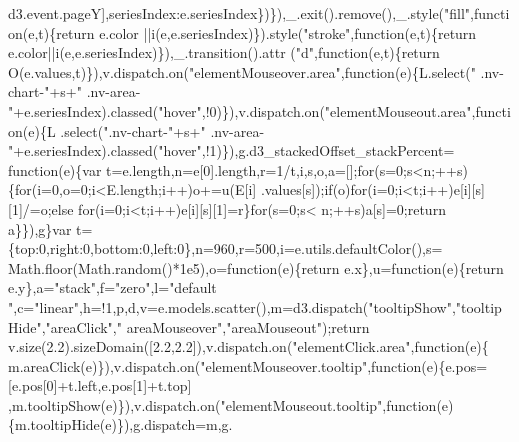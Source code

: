 \begin{DoxyCode}
      d3.event.pageY],seriesIndex:e.seriesIndex\})\}),\_.exit().remove(),\_.style(\textcolor{stringliteral}{"fill"},\textcolor{keyword}{function}(e,t)\{\textcolor{keywordflow}{return} e.color
      ||i(e,e.seriesIndex)\}).style(\textcolor{stringliteral}{"stroke"},\textcolor{keyword}{function}(e,t)\{\textcolor{keywordflow}{return} e.color||i(e,e.seriesIndex)\}),\_.transition().attr
      (\textcolor{stringliteral}{"d"},\textcolor{keyword}{function}(e,t)\{\textcolor{keywordflow}{return} O(e.values,t)\}),v.dispatch.on(\textcolor{stringliteral}{"elementMouseover.area"},\textcolor{keyword}{function}(e)\{L.select(\textcolor{stringliteral}{"
      .nv-chart-"}+s+\textcolor{stringliteral}{" .nv-area-"}+e.seriesIndex).classed(\textcolor{stringliteral}{"hover"},!0)\}),v.dispatch.on(\textcolor{stringliteral}{"elementMouseout.area"},\textcolor{keyword}{function}(e)\{L
      .select(\textcolor{stringliteral}{".nv-chart-"}+s+\textcolor{stringliteral}{" .nv-area-"}+e.seriesIndex).classed(\textcolor{stringliteral}{"hover"},!1)\}),g.d3\_stackedOffset\_stackPercent=\textcolor{keyword}{
      function}(e)\{var t=e.length,n=e[0].length,r=1/t,i,s,o,a=[];\textcolor{keywordflow}{for}(s=0;s<n;++s)\{\textcolor{keywordflow}{for}(i=0,o=0;i<E.length;i++)o+=u(E[i]
      .values[s]);\textcolor{keywordflow}{if}(o)\textcolor{keywordflow}{for}(i=0;i<t;i++)e[i][s][1]/=o;\textcolor{keywordflow}{else} \textcolor{keywordflow}{for}(i=0;i<t;i++)e[i][s][1]=r\}\textcolor{keywordflow}{for}(s=0;s<
      n;++s)a[s]=0;\textcolor{keywordflow}{return} a\}\}),g\}var t=\{top:0,right:0,bottom:0,left:0\},n=960,r=500,i=e.utils.defaultColor(),s=
      Math.floor(Math.random()*1e5),o=\textcolor{keyword}{function}(e)\{\textcolor{keywordflow}{return} e.x\},u=\textcolor{keyword}{function}(e)\{\textcolor{keywordflow}{return} e.y\},a=\textcolor{stringliteral}{"stack"},f=\textcolor{stringliteral}{"zero"},l=\textcolor{stringliteral}{"default
      "},c=\textcolor{stringliteral}{"linear"},h=!1,p,d,v=e.models.scatter(),m=d3.dispatch(\textcolor{stringliteral}{"tooltipShow"},\textcolor{stringliteral}{"tooltipHide"},\textcolor{stringliteral}{"areaClick"},\textcolor{stringliteral}{"
      areaMouseover"},\textcolor{stringliteral}{"areaMouseout"});\textcolor{keywordflow}{return} v.size(2.2).sizeDomain([2.2,2.2]),v.dispatch.on(\textcolor{stringliteral}{"elementClick.area"},\textcolor{keyword}{function}(e)\{
      m.areaClick(e)\}),v.dispatch.on(\textcolor{stringliteral}{"elementMouseover.tooltip"},\textcolor{keyword}{function}(e)\{e.pos=[e.pos[0]+t.left,e.pos[1]+t.top]
      ,m.tooltipShow(e)\}),v.dispatch.on(\textcolor{stringliteral}{"elementMouseout.tooltip"},\textcolor{keyword}{function}(e)\{m.tooltipHide(e)\}),g.dispatch=m,g.

\end{DoxyCode}
